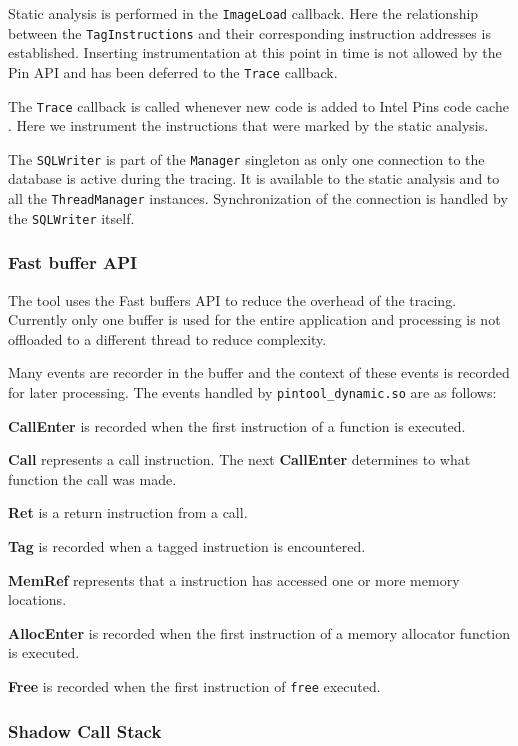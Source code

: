 Static analysis is performed in the \texttt{ImageLoad} callback. Here the relationship between the \texttt{TagInstructions} and their corresponding instruction addresses is established. Inserting instrumentation at this point in time is not allowed by the Pin API and has been deferred to the \texttt{Trace} callback.

The \texttt{Trace} callback is called whenever new code is added to Intel Pins code cache \cite{pindoc}. Here we instrument the instructions that were marked by the static analysis.

The \texttt{SQLWriter} is part of the \texttt{Manager} singleton as only one connection to the database is active during the tracing. It is available to the static analysis and to all the \texttt{ThreadManager} instances. Synchronization of the connection is handled by the \texttt{SQLWriter} itself. 

\subsubsection{Fast buffer API}

The tool uses the Fast buffers API to reduce the overhead of the tracing. Currently only one buffer is used for the entire application and processing is not offloaded to a different thread to reduce complexity.

Many events are recorder in the buffer and the context of these events is recorded for later processing. The events handled by \texttt{pintool\_dynamic.so} are as follows:

\textbf{CallEnter} is recorded when the first instruction of a function is executed.

\textbf{Call} represents a call instruction. The next \textbf{CallEnter} determines to what function the call was made. 

\textbf{Ret} is a return instruction from a call.

\textbf{Tag} is recorded when a tagged instruction is encountered.

\textbf{MemRef} represents that a instruction has accessed one or more memory locations.

\textbf{AllocEnter} is recorded when the first instruction of a memory allocator function is executed.

\textbf{Free} is recorded when the first instruction of \texttt{free} executed.

\subsubsection{Shadow Call Stack}

